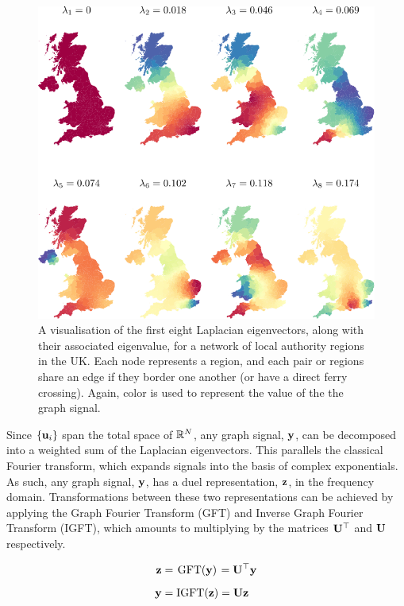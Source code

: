\begin{figure}[t]
	\centering
		\includegraphics[width=0.85\linewidth]{Figures/uk_plot.pdf}
        \caption[A visualisation of the Laplacian eigenvectors for a network of regions in the UK]{A visualisation of the first eight Laplacian eigenvectors, along with their associated eigenvalue, for a network of local authority regions in the UK. Each node represents a region, and each pair or regions share an edge if they border one another (or have a direct ferry crossing). Again, color is used to represent the value of the the graph signal. }
	\label{fig:uk_eigs}
\end{figure}


Since $\{\mathbf{u}_i\}$ span the total space of $\mathbb{R}^N$, any graph signal, $\mathbf{y}$, can be decomposed into a weighted sum of the Laplacian eigenvectors. This parallels the classical Fourier transform, which expands signals into the basis of complex exponentials. As such, any graph signal, $\mathbf{y}$, has a duel representation, $\mathbf{z}$, in the frequency domain. Transformations between these two representations can be achieved by applying the Graph Fourier Transform (GFT) and Inverse Graph Fourier Transform (IGFT), which amounts to multiplying by the matrices $\mathbf{U}^\top$ and $\mathbf{U}$ respectively. 

\begin{align}
    \mathbf{z} &= \mkern 2mu \text{GFT}(\mathbf{y}) \mkern 2mu = \mathbf{U}^\top \mathbf{y} \\[0.2cm]
    \mathbf{y} &= \text{IGFT}(\mathbf{z})  = \mathbf{U} \mathbf{z}
\end{align}

